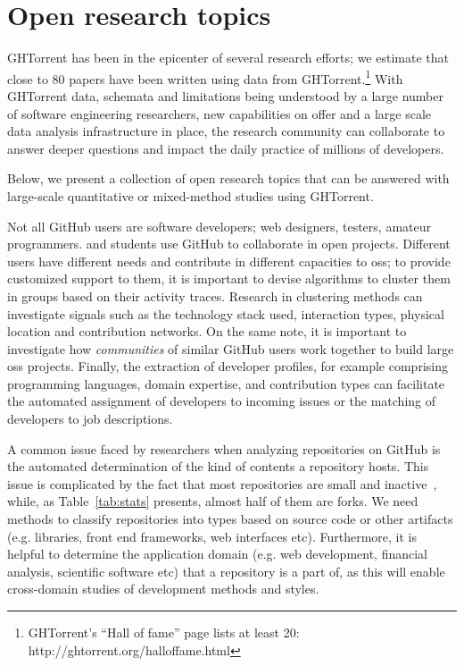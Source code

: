 \documentclass{sig-alternate}
\begin{document}
\section{Open research topics}

GHTorrent has been in the epicenter of several research
efforts; we estimate that close to 80 papers have been written using data from
GHTorrent.\footnote{GHTorrent's ``Hall of fame'' page lists at least 20:
http://ghtorrent.org/halloffame.html} With GHTorrent data, schemata and
limitations being understood by a large number of software engineering
researchers, new capabilities on offer and a large scale data analysis
infrastructure in place, the research community can collaborate to answer deeper
questions and impact the daily practice of millions of developers.

Below, we present a collection of open research topics that can be answered
with large-scale quantitative or mixed-method studies using GHTorrent.

 Not all GitHub users are software developers;
web designers, testers, amateur programmers. and students use GitHub to
collaborate in open projects. Different users have different needs and
contribute in different capacities to {\sc oss}; to provide customized support
to them, it is important to devise algorithms to cluster them in groups based on
their activity traces. Research in clustering methods can investigate signals
such as the technology stack used, interaction types, physical location and
contribution networks. On the same note, it is important to investigate how
\emph{communities} of similar GitHub users work together to build large {\sc
oss} projects. Finally, the extraction of developer profiles, for example
comprising programming languages, domain expertise, and contribution types can
facilitate the automated assignment of developers to incoming issues or the
matching of developers to job descriptions.

 A common issue faced by researchers when analyzing
repositories on GitHub is the automated determination of the kind of contents a
repository hosts. This issue is complicated by the fact that most repositories
are small and inactive~\cite{KGBSGD15}, while, as Table~\ref{tab:stats}
presents, almost half of them are forks. We need methods to classify
repositories into types based on source code or other artifacts (e.g. libraries,
front end frameworks, web interfaces etc).  Furthermore, it is helpful to
determine the application domain (e.g. web development, financial analysis,
scientific software etc) that a repository is a part of, as this will enable
cross-domain studies of development methods and styles.
\end{document}
